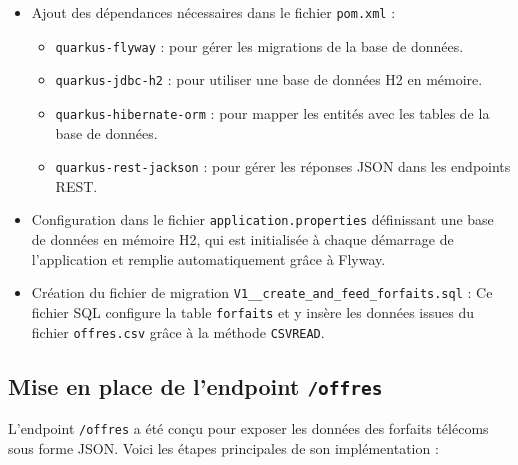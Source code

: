 \documentclass[11pt]{article}
\begin{document}
		\begin{itemize}
			\item Ajout des dépendances nécessaires dans le fichier \texttt{pom.xml} :
			\begin{itemize}
				\item \texttt{quarkus-flyway} : pour gérer les migrations de la base de données.
				\item \texttt{quarkus-jdbc-h2} : pour utiliser une base de données H2 en mémoire.
				\item \texttt{quarkus-hibernate-orm} : pour mapper les entités avec les tables de la base de données.
				\item \texttt{quarkus-rest-jackson} : pour gérer les réponses JSON dans les endpoints REST.
			\end{itemize}
			
			\item Configuration dans le fichier \texttt{application.properties}
			définissant une base de données en mémoire H2, qui est initialisée à chaque démarrage de l'application et remplie  automatiquement grâce à Flyway.
			
			\item Création du fichier de migration \texttt{V1\_\_create\_and\_feed\_forfaits.sql} :
			Ce fichier SQL configure la table \texttt{forfaits} et y insère les données issues du fichier \texttt{offres.csv} grâce à la méthode \texttt{CSVREAD}.
		\end{itemize}
		
		\subsection{Mise en place de l'endpoint \texttt{/offres}}
		
		L'endpoint \texttt{/offres} a été conçu pour exposer les données des forfaits télécoms sous forme JSON. Voici les étapes principales de son implémentation :
\end{document}
